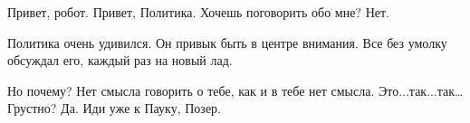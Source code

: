 \begin{dialog}
\X Привет, робот.
\R Привет, Политика.
\X Хочешь поговорить обо мне?
\R Нет.
\end{dialog}

\begin{monolog}
Политика очень удивился. Он привык быть в центре внимания. Все без умолку обсуждал его, каждый раз на новый лад.
\end{monolog}

\begin{dialog}
\X Но почему?
\R Нет смысла говорить о тебе, как и в тебе нет смысла.
\X Это...так...так…
\R Грустно?
\X Да.
\R Иди уже к Пауку, Позер.
\end{dialog}